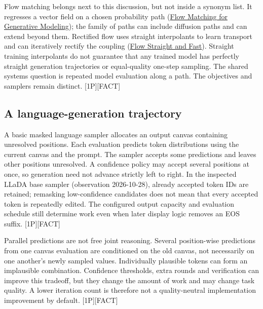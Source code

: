 Flow matching belongs next to this discussion, but not inside a synonym
list. It regresses a vector field on a chosen probability path
(\href{https://arxiv.org/abs/2210.02747}{Flow Matching for Generative
Modeling}); the family of paths can include diffusion paths and can
extend beyond them. Rectified flow uses straight interpolants to learn
transport and can iteratively rectify the coupling
(\href{https://arxiv.org/abs/2209.03003}{Flow Straight and Fast}).
Straight training interpolants do not guarantee that any trained model
has perfectly straight generation trajectories or equal-quality one-step
sampling. The shared systems question is repeated model evaluation along
a path. The objectives and samplers remain distinct. \mbox{{[}1P{]}}\hspace{0pt}\mbox{{[}FACT{]}}

\subsection{A language-generation
trajectory}\label{a-language-generation-trajectory}

A basic masked language sampler allocates an output canvas containing
unresolved positions. Each evaluation predicts token distributions using
the current canvas and the prompt. The sampler accepts some predictions
and leaves other positions unresolved. A confidence policy may accept
several positions at once, so generation need not advance strictly left
to right. In the inspected LLaDA base sampler (observation 2026-10-28),
already accepted token IDs are retained; remasking low-confidence
candidates does not mean that every accepted token is repeatedly edited.
The configured output capacity and evaluation schedule still determine
work even when later display logic removes an EOS suffix.
\mbox{{[}1P{]}}\hspace{0pt}\mbox{{[}FACT{]}}

Parallel predictions are not free joint reasoning. Several position-wise
predictions from one canvas evaluation are conditioned on the old
canvas, not necessarily on one another's newly sampled values.
Individually plausible tokens can form an implausible combination.
Confidence thresholds, extra rounds and verification can improve this
tradeoff, but they change the amount of work and may change task
quality. A lower iteration count is therefore not a quality-neutral
implementation improvement by default. \mbox{{[}1P{]}}\hspace{0pt}\mbox{{[}FACT{]}}

